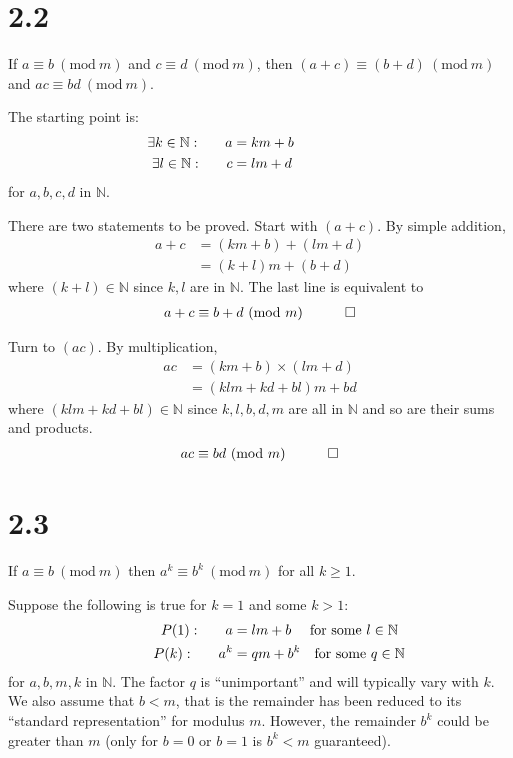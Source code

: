 \documentclass[12pt]{article}
\newcommand{\modulo}[1]{~(\mathrm{mod}~#1)}
\begin{document}
\clearpage
\section*{2.2}
\begin{question}
If $a\equiv b\modulo{m}$ and $c\equiv d\modulo{m}$, then $(a+c)\equiv (b+d)\modulo{m}$ and $ac\equiv bd\modulo{m}$.
\end{question}

The starting point is:
\begin{align*}
\mathllap{\exists k\in\mathbb{N}:\hspace{2em}}
  a & = km + b \\
\mathllap{\exists l\in\mathbb{N}:\hspace{2em}}
  c & = lm + d
\end{align*}
for $a,b,c,d$ in $\mathbb{N}$. 

There are two statements to be proved. Start with $(a+c)$. By simple addition,
\begin{align*}
a + c & = (km + b) + (lm + d) \\
  & = (k+l)m + (b+d)
\end{align*}
where $(k+l)\in\mathbb{N}$ since $k,l$ are in $\mathbb{N}$. 
The last line is equivalent to
\begin{align*}
a+c\equiv b+d\modulo{m} \quad \qed
\end{align*}

Turn to $(ac)$. By multiplication,
\begin{align*}
a c & = (km + b) \times (lm + d) \\
  & = (klm+kd+bl)m + bd
\end{align*}
where $(klm+kd+bl)\in\mathbb{N}$ since $k,l,b,d,m$ are all in $\mathbb{N}$ and so are their sums and products. 
\begin{align*}
ac\equiv bd\modulo{m} \quad \qed
\end{align*}



\clearpage
\section*{2.3}
\begin{question}
If $a\equiv b\modulo{m}$ then $a^{k}\equiv b^{k}\modulo{m}$ for all $k\geq1$.
\end{question}

Suppose the following is true for $k=1$ and some $k>1$:
\begin{align*}
\mathllap{P(1): \hspace{2em}}
  a & = lm + b 
  \mathrlap{\quad~\text{for some}~l\in\mathbb{N}} \\
\mathllap{P(k): \hspace{2em}}
  a^{k} & = qm + b^{k} 
  \mathrlap{\quad\text{for some}~q\in\mathbb{N}} \\
\end{align*}
for $a,b,m,k$ in $\mathbb{N}$. The factor $q$ is ``unimportant'' and will typically vary with $k$. We also assume that $b<m$, that is the remainder has been reduced to its ``standard representation'' for modulus $m$. However, the remainder $b^{k}$ could be greater than $m$ (only for $b=0$ or $b=1$ is $b^{k}<m$ guaranteed). 
\end{document}
